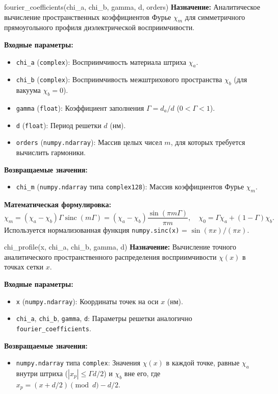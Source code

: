 \documentclass[a4paper,11pt]{article}
\begin{document}
\begin{funcbox}{fourier\_coefficients(chi\_a, chi\_b, gamma, d, orders)}
\textbf{Назначение:} Аналитическое вычисление пространственных коэффициентов Фурье $\chi_m$ для симметричного прямоугольного профиля диэлектрической восприимчивости.

\textbf{Входные параметры:}
\begin{itemize}
    \item \texttt{chi\_a} (\texttt{complex}): Восприимчивость материала штриха $\chi_a$.
    \item \texttt{chi\_b} (\texttt{complex}): Восприимчивость межштрихового пространства $\chi_b$ (для вакуума $\chi_b = 0$).
    \item \texttt{gamma} (\texttt{float}): Коэффициент заполнения $\Gamma = d_a / d$ ($0 < \Gamma < 1$).
    \item \texttt{d} (\texttt{float}): Период решетки $d$ (нм).
    \item \texttt{orders} (\texttt{numpy.ndarray}): Массив целых чисел $m$, для которых требуется вычислить гармоники.
\end{itemize}

\textbf{Возвращаемые значения:}
\begin{itemize}
    \item \texttt{chi\_m} (\texttt{numpy.ndarray} типа \texttt{complex128}): Массив коэффициентов Фурье $\chi_m$.
\end{itemize}

\textbf{Математическая формулировка:}
\begin{equation*}
\chi_m = (\chi_a - \chi_b) \Gamma \operatorname{sinc}(m \Gamma) = (\chi_a - \chi_b) \frac{\sin(\pi m \Gamma)}{\pi m}, \quad \chi_0 = \Gamma \chi_a + (1 - \Gamma) \chi_b.
\end{equation*}
Используется нормализованная функция \texttt{numpy.sinc(x)} = $\sin(\pi x) / (\pi x)$.
\end{funcbox}

\begin{funcbox}{chi\_profile(x, chi\_a, chi\_b, gamma, d)}
\textbf{Назначение:} Вычисление точного аналитического пространственного распределения восприимчивости $\chi(x)$ в точках сетки $x$.

\textbf{Входные параметры:}
\begin{itemize}
    \item \texttt{x} (\texttt{numpy.ndarray}): Координаты точек на оси $x$ (нм).
    \item \texttt{chi\_a}, \texttt{chi\_b}, \texttt{gamma}, \texttt{d}: Параметры решетки аналогично \texttt{fourier\_coefficients}.
\end{itemize}

\textbf{Возвращаемые значения:}
\begin{itemize}
    \item \texttt{numpy.ndarray} типа \texttt{complex}: Значения $\chi(x)$ в каждой точке, равные $\chi_a$ внутри штриха ($|x_p| \le \Gamma d / 2$) и $\chi_b$ вне его, где $x_p = (x + d/2) \pmod d - d/2$.
\end{itemize}
\end{funcbox}
\end{document}
